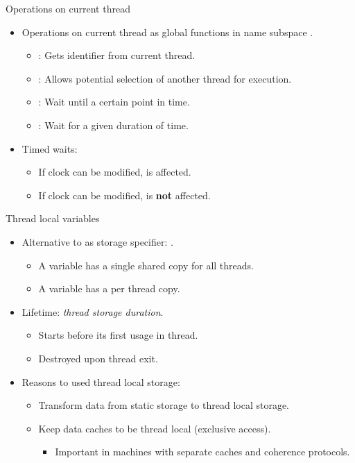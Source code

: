 \begin{frame}{Operations on current thread}
\begin{itemize}
  \item Operations on current thread as global functions in name subspace .
    \begin{itemize}
      \item {}: Gets identifier from current thread.
      \item {}: Allows potential selection of another thread for execution.
      \item {}: Wait until a certain point in time.
      \item {}: Wait for a given duration of time.
    \end{itemize}
  \item Timed waits:
    \begin{itemize}
      \item If clock can be modified,  is affected.
      \item If clock can be modified,  is \textbf{not} affected.
    \end{itemize}
\end{itemize}
\end{frame}

\begin{frame}[t]{Thread local variables}
\begin{itemize}
  \item Alternative to  as storage specifier: .
    \begin{itemize}
      \item A variable  has a single shared copy for all threads.
      \item A variable  has a per thread copy.
    \end{itemize}
  \item Lifetime: \emph{thread storage duration}.
    \begin{itemize}
      \item Starts before its first usage in thread.
      \item Destroyed upon thread exit.
    \end{itemize}
  \item Reasons to used thread local storage:
    \begin{itemize}
      \item Transform data from static storage to thread local storage.
      \item Keep data caches to be thread local (exclusive access).
        \begin{itemize}
          \item Important in machines with separate caches and coherence protocols.
        \end{itemize}
    \end{itemize}
\end{itemize}
\end{frame}


